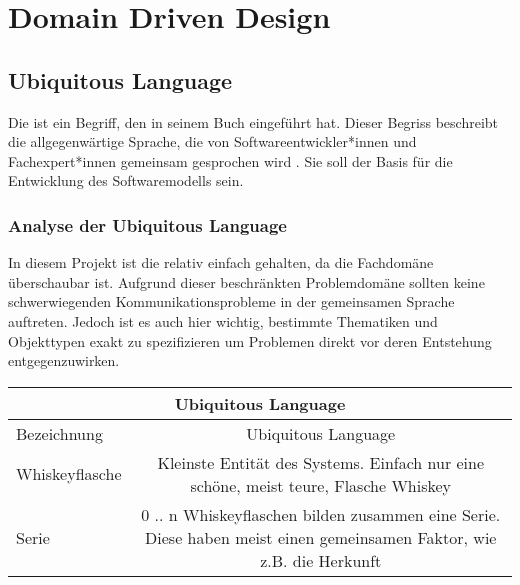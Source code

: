 
\chapter{Domain Driven Design}
	

	\section{Ubiquitous Language}
	Die  ist ein Begriff, den \citeauthor{evans2004ddd} in seinem Buch  eingeführt hat. Dieser Begriss beschreibt die allgegenwärtige Sprache, die von Softwareentwickler*innen und Fachexpert*innen gemeinsam gesprochen wird \cite{ubiquitousLanguage.entwicklerDE}. Sie soll der Basis für die Entwicklung des Softwaremodells sein.
	
		\subsection{Analyse der Ubiquitous Language}
		In diesem Projekt ist die  relativ einfach gehalten, da die Fachdomäne überschaubar ist. Aufgrund dieser beschränkten Problemdomäne sollten keine schwerwiegenden Kommunikationsprobleme in der gemeinsamen Sprache auftreten. Jedoch ist es auch hier wichtig, bestimmte Thematiken und Objekttypen exakt zu spezifizieren um Problemen direkt vor deren Entstehung entgegenzuwirken.
		
		\begin{table}[ht]
			\begin{adjustbox}{width=1\textwidth}
				\begin{tabular}{|l|c|}
					\hline
					\multicolumn{2}{|c|}{Ubiquitous Language} \\
					\hline
					\hk{normale} Bezeichnung 		&		Ubiquitous Language \\
					\hline
					Whiskeyflasche				&		Kleinste Entität des Systems. Einfach nur eine schöne, meist teure, Flasche Whiskey \\
					Serie						&		0 .. n Whiskeyflaschen bilden zusammen eine Serie. Diese haben meist einen gemeinsamen Faktor, wie z.B. die Herkunft \\
					\hline
				\end{tabular}
			\end{adjustbox}
		\end{table}
	
